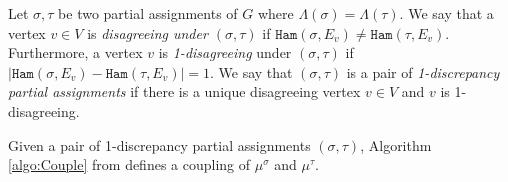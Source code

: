\documentclass[11pt]{article}
\newcommand{\abs}[1]{\left\vert#1\right\vert}
\def\!#1{\mathtt{#1}}
\newcommand{\qgl}[1]{{\color{purple}{#1}}}
\newcommand{\hktodo}[1]{{\color{blue}{#1}}}
\begin{document}
    Let $\sigma, \tau$ be two partial assignments of $G$ where $\Lambda(\sigma) = \Lambda(\tau)$.
    We say that a vertex $v \in V$ is \emph{disagreeing under $(\sigma, \tau)$} if ${\!{Ham}\left(\sigma,{E_v}\right)}\neq{\!{Ham}\left(\tau,{E_v}\right)}$. Furthermore, a vertex $v$ is \emph{1-disagreeing} under $(\sigma, \tau)$ if $\abs{{\!{Ham}\left(\sigma,{E_v}\right)}-{\!{Ham}\left(\tau,{E_v}\right)}}=1$.
    We say that $(\sigma, \tau)$ is a pair of \emph{1-discrepancy partial assignments} if there is a unique disagreeing vertex $v \in V$ and $v$ is 1-disagreeing.

    Given a pair of 1-discrepancy partial assignments $(\sigma,\tau)$,
    Algorithm \ref{algo:Couple} from \cite{CG24bMatching} defines a 
    coupling of $\mu^{\sigma}$ and $\mu^{\tau}$.
    \hktodo{the use of the coupling in our paper}
\end{document}
